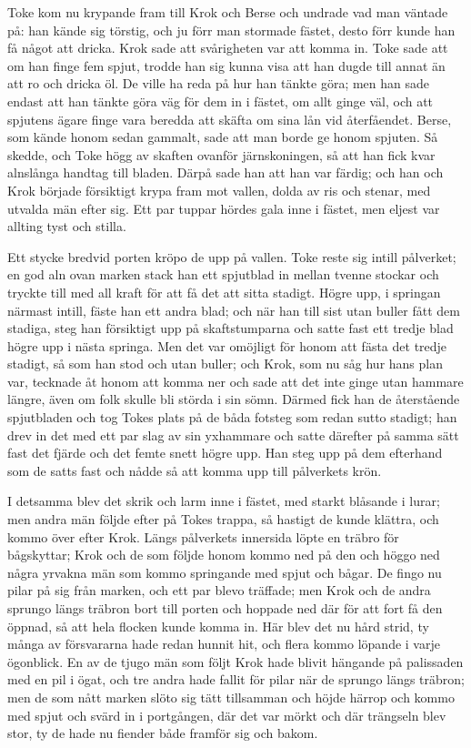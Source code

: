 \initial Toke kom nu krypande fram till Krok och Berse och undrade vad man väntade på: han kände sig törstig, och ju förr man stormade fästet, desto förr kunde han få något att dricka. Krok sade att svårigheten var att komma in. Toke sade att om han finge fem spjut, trodde han sig kunna visa att han dugde till annat än att ro och dricka öl. De ville ha reda på hur han tänkte göra; men han sade endast att han tänkte göra väg för dem in i fästet, om allt ginge väl, och att spjutens ägare finge vara beredda att skäfta om sina lån vid återfåendet. Berse, som kände honom sedan gammalt, sade att man borde ge honom spjuten. Så skedde, och Toke högg av skaften ovanför järnskoningen, så att han fick kvar alnslånga handtag till bladen. Därpå sade han att han var färdig; och han och Krok började försiktigt krypa fram mot vallen, dolda av ris och stenar, med utvalda män efter sig. Ett par tuppar hördes gala inne i fästet, men eljest var allting tyst och stilla.

\initial Ett stycke bredvid porten kröpo de upp på vallen. Toke reste sig intill pålverket; en god aln ovan marken stack han ett spjutblad in mellan tvenne stockar och tryckte till med all kraft för att få det att sitta stadigt. Högre upp, i springan närmast intill, fäste han ett andra blad; och när han till sist utan buller fått dem stadiga, steg han försiktigt upp på skaftstumparna och satte fast ett tredje blad högre upp i nästa springa. Men det var omöjligt för honom att fästa det tredje stadigt, så som han stod och utan buller; och Krok, som nu såg hur hans plan var, tecknade åt honom att komma ner och sade att det inte ginge utan hammare längre, även om folk skulle bli störda i sin sömn. Därmed fick han de återstående spjutbladen och tog Tokes plats på de båda fotsteg som redan sutto stadigt; han drev in det med ett par slag av sin yxhammare och satte därefter på samma sätt fast det fjärde och det femte snett högre upp. Han steg upp på dem efterhand som de satts fast och nådde så att komma upp till pålverkets krön.

\initial I detsamma blev det skrik och larm inne i fästet, med starkt blåsande i lurar; men andra män följde efter på Tokes trappa, så hastigt de kunde klättra, och kommo över efter Krok. Längs pålverkets innersida löpte en träbro för bågskyttar; Krok och de som följde honom kommo ned på den och höggo ned några yrvakna män som kommo springande med spjut och bågar. De fingo nu pilar på sig från marken, och ett par blevo träffade; men Krok och de andra sprungo längs träbron bort till porten och hoppade ned där för att fort få den öppnad, så att hela flocken kunde komma in. Här blev det nu hård strid, ty många av försvararna hade redan hunnit hit, och flera kommo löpande i varje ögonblick. En av de tjugo män som följt Krok hade blivit hängande på palissaden med en pil i ögat, och tre andra hade fallit för pilar när de sprungo längs träbron; men de som nått marken slöto sig tätt tillsamman och höjde härrop och kommo med spjut och svärd in i portgången, där det var mörkt och där trängseln blev stor, ty de hade nu fiender både framför sig och bakom.

